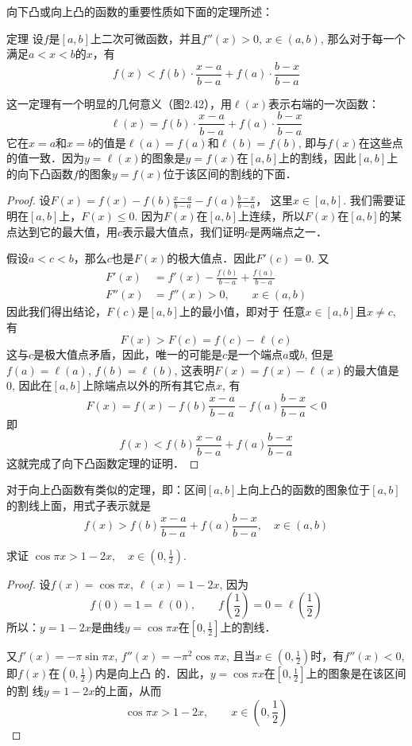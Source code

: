 向下凸或向上凸的函数的重要性质如下面的定理所述：

\begin{blk}
    {定理} 设$f$是$[a,b]$上二次可微函数，并且$f''(x)>0$, $x\in (a,b)$, 那么对于每一个满足$a<x<b$的$x$，有
\[f(x)<f(b)\cdot \frac{x-a}{b-a}+f(a)\cdot \frac{b-x}{b-a}\]
\end{blk}

这一定理有一个明显的几何意义（图2.42），用$\ell(x)$表示右端的一次函数：
\[\ell(x)=f(b)\cdot \frac{x-a}{b-a}+f(a)\cdot \frac{b-x}{b-a}\]
    它在$x=a$和$x=b$的值是$\ell(a)=f(a)$和$\ell(b)=f(b)$, 即与$f(x)$在这些点的值一致．因为$y=\ell(x)$的图象是$y=f(x)$在$[a,b]$上的割线，因此$[a,b]$上的向下凸函数$f$的图象$y=f(x)$位于该区间的割线的下面．





\begin{proof}
设$F(x)=f(x)-f(b)\frac{x-a}{b-a}-f(a)\frac{b-x}{b-a}$，
这里$x\in [a,b]$. 我们需要证明在$[a,b]$上，$F(x)\le 0$. 因为$F(x)$在$[a,b]$上连续，所以$F(x)$在$[a,b]$的某点达到它的最大值，用$c$表示最大值点，我们证明$c$是两端点之一．

假设$a<c<b$，那么$c$也是$F(x)$的极大值点．因此$F'(c)=0$. 又
\begin{align*}
    F'(x)&=f'(x)-\frac{f(b)}{b-a}+\frac{f(a)}{b-a}\\
    F''(x)&=f''(x)>0,\qquad x\in(a,b)
\end{align*}
因此我们得出结论，$F(c)$是$[a,b]$上的最小值，即对于
任意$x\in [a,b]$且$x\ne c$, 有
\[F (x) > F (c) =f (c) -\ell (c)\]
这与$c$是极大值点矛盾，因此，唯一的可能是$c$是一个端点$a$或$b$, 但是$f(a)=\ell(a)$, $f(b)=\ell(b)$, 这表明$F(x)=f(x)-\ell(x)$的最大值是0, 因此在$[a,b]$上除端点以外的所有其它点$x$, 有
\[F (x) =f (x) -f (b) \frac{x-a}{b-a}-f (a) \frac{b-x}{b-a}<0\]
即
\[f (x)<f (b) \frac{x-a}{b-a}+f (a) \frac{b-x}{b-a}\]
这就完成了向下凸函数定理的证明．
\end{proof}

对于向上凸函数有类似的定理，即：区间$[a,b]$上向上凸的函数的图象位于$[a,b]$的割线上面，用式子表示就是
\[f (x)>f (b) \frac{x-a}{b-a}+f (a) \frac{b-x}{b-a},\quad x\in(a,b)\]

\begin{example}
    求证 $\cos\pi x>1-2x,\quad x\in\left(0, \frac{1}{2}\right)$.
\end{example}


\begin{proof}
    设$f(x)=\cos\pi x$, $\ell (x)=1-2x$, 因为
\[f (0) =1=\ell (0) ,\qquad f \left(\frac{1}{2}\right) =0=\ell\left(\frac{1}{2}\right)\]
所以：$y=1-2x$是曲线$y=\cos\pi x$在$\left[0,\frac{1}{2}\right]$上的割线．

又$f'(x)=-\pi \sin\pi x$, $f''(x)=-\pi^2\cos\pi x$, 且当$x\in \left(0,\frac{1}{2}\right)$时，有$f''(x)<0$, 即$f(x)$在$\left(0,\frac{1}{2}\right)$内是向上凸
的．因此，$y=\cos\pi x$在$\left[0,\frac{1}{2}\right]$上的图象是在该区间的割
线$y=1-2x$的上面，从而
\[\cos\pi x>1-2x,\qquad x\in \left(0,\frac{1}{2}\right)\]
\end{proof}


